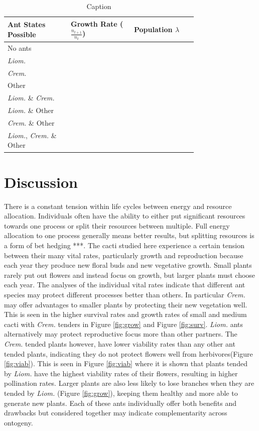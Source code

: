 \documentclass[12pt,a4paper]{article}
\begin{document}
\begin{table}[]
	\centering
	\begin{tabular}{|p{0.25 \linewidth}   |p{0.25 \linewidth}|p{0.25 \linewidth}|}
		\hline
		\textbf{Ant States Possible} & \textbf{Growth Rate ($\frac{n_{t+1}}{n_t}$)} & \textbf{Population $\lambda$}\\
		\hline
		No ants & &\\
		\hline
		\textit{Liom.} & & \\
		\hline
		\textit{Crem.}  & & \\
		\hline
		Other & & \\
		\hline
		\textit{Liom.} \& \textit{Crem.} & & \\
		\hline
		\textit{Liom.} \& Other & & \\
		\hline 
		\textit{Crem.} \& Other & & \\
		\hline
		\textit{Liom.}, \textit{Crem.} \& Other & & \\
		\hline
	\end{tabular}
	\caption{Caption}
	\label{tab:table_sims}
\end{table}

\section*{Discussion}

There is a constant tension within life cycles between energy and resource allocation. Individuals often have the ability to either put significant resources towards one process or split their resources between multiple. Full energy allocation to one process generally means better results, but splitting resources is a form of bet hedging ***. The cacti studied here experience a certain tension between their many vital rates, particularly growth and reproduction because each year they produce new floral buds and new vegetative growth. Small plants rarely put out flowers and instead focus on growth, but larger plants must choose each year. The analyses of the individual vital rates indicate that different ant species may protect different processes better than others. In particular \textit{Crem.} may offer advantages to smaller plants by protecting their new vegetation well. This is seen in the higher survival rates and growth rates of small and medium cacti with \textit{Crem.} tenders in Figure \ref{fig:grow} and Figure \ref{fig:surv}. \textit{Liom.} ants alternatively may protect reproductive focus more than other partners. The \textit{Crem.} tended plants however, have lower viability rates than any other ant tended plants, indicating they do not protect flowers well from herbivores(Figure \ref{fig:viab}). This is seen in Figure \ref{fig:viab} where it is shown that plants tended by \textit{Liom.} have the highest viability rates of their flowers, resulting in higher pollination rates. Larger plants are also less likely to lose branches when they are tended by \textit{Liom.} (Figure \ref{fig:grow}), keeping them healthy and more able to generate new plants. Each of these ants individually offer both benefits and drawbacks but considered together may indicate complementarity across ontogeny. 
	
\end{document}
